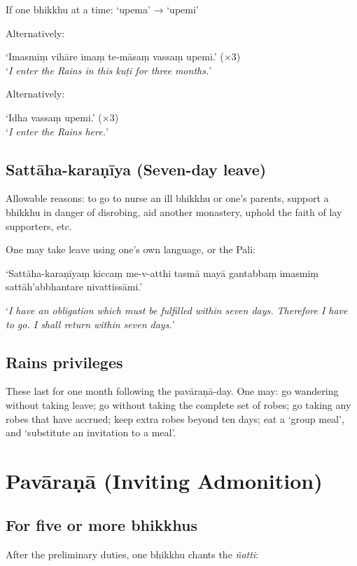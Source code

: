If one bhikkhu at a time: ‘upema’ → ‘upemi’

Alternatively:

‘Imasmiṃ vihāre imaṃ te-māsaṃ vassaṃ upemi.’ (×3)\\
‘\emph{I enter the Rains in this kuṭi for three months.}’

Alternatively:

‘Idha vassaṃ upemi.’ (×3)\\
‘\emph{I enter the Rains here.}’ 

\subsection{Sattāha-karaṇīya (Seven-day leave)}

Allowable reasons: to go to nurse an ill bhikkhu or one's parents, support a
bhikkhu in danger of disrobing, aid another monastery, uphold the faith of lay
supporters, etc.

One may take leave using one's own language, or the Pali:

‘Sattāha-karaṇīyaṃ kiccaṃ me-v-atthi tasmā mayā gantabbaṃ imasmiṃ
sattāh'abbhantare nivattissāmi.’

‘\emph{I have an obligation which must be fulfilled within seven days. Therefore
  I have to go. I shall return within seven days.}’\\
\mbox{}

\subsection{Rains privileges}

These last for one month following the pavāraṇā-day. One may: go wandering
without taking leave; go without taking the complete set of robes; go taking any
robes that have accrued; keep extra robes beyond ten days; eat a ‘group meal’,
and ‘substitute an invitation to a meal’.

\section{Pavāraṇā (Inviting Admonition)}

\subsection{For five or more bhikkhus}

After the preliminary duties, one bhikkhu chants the \emph{ñatti}:

